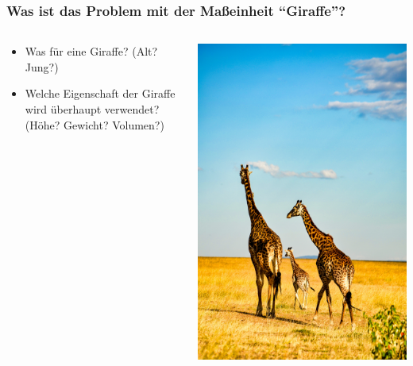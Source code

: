 \documentclass{beamer}
\begin{document}
\begin{frame}
\frametitle{Was ist das Problem mit der Maßeinheit ``Giraffe''?}


\begin{columns}

\begin{column}{5cm}


\begin{itemize}
\item
Was für eine Giraffe? (Alt? Jung?)  
\item
Welche Eigenschaft der Giraffe wird überhaupt verwendet? (Höhe? Gewicht? Volumen?)

\end{itemize}

\end{column}

\begin{column}{5cm}

\begin{center}
\includegraphics[width=\textwidth]{Giraffen.jpg}
\end{center}




\end{column}
\end{columns}
\end{frame}
\end{document}
